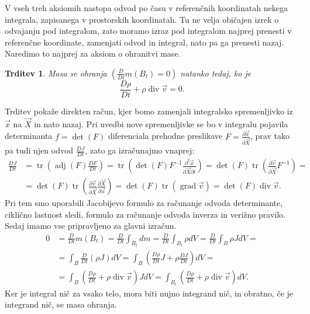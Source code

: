 \documentclass[12pt,a4paper]{article}
\theoremstyle{definition} %
\theoremstyle{plain} %
\newtheorem{trditev}[definicija]{Trditev}
\numberwithin{equation}{section}
\renewcommand{\div}{\operatorname{div}}
\newcommand{\grad}{\operatorname{grad}}
\newcommand{\dpar}[2]{\ensuremath{\frac{\partial #1}{\partial #2}}}
\newcommand{\DD}[2]{\ensuremath{\frac{D #1}{D #2}}}
\newcommand{\DDt}[1]{\DD{#1}{t}}
\newcommand{\vv}{\vec{v}}
\newcommand{\vX}{\vec{X}}
\newcommand{\vx}{\vec{x}}
\DeclareMathOperator{\tr}{tr}
\begin{document}
V vseh treh aksiomih nastopa odvod po času v referenčnih koordinatah nekega
integrala, zapisanega v prostorskih koordinatah. Tu ne velja običajen izrek o
odvajanju pod integralom, zato moramo izraz pod integralom najprej prenesti v
referenčne koordinate, zamenjati odvod in integral, nato pa ga prenesti nazaj.
Naredimo to najprej za aksiom o ohranitvi mase.
\begin{trditev} Masa se ohranja $(\DDt{}m(B_t) = 0)$ natanko tedaj, ko je
  \begin{equation}
    \DDt\rho + \rho\div\vv = 0.
    \label{eq:ohr-masa}
  \end{equation}
\end{trditev}
\proof
Trditev pokaže direkten račun, kjer bomo zamenjali integralsko spremenljivko iz
$\vx$ na $\vX$ in nato nazaj. Pri uvedbi nove spremenljivke se bo v integralu
pojavila determinanta $f = \det(F)$ diferenciala prehodne preslikave $F =
\dpar{\vx}{\vX}$, prav tako pa tudi njen odvod $\DDt{J}$, zato ga izračunajmo vnaprej:
\begin{align*}
  \DDt J &= \tr\left(\operatorname{adj}(F) \DDt{F}\right) =
  \tr\left(\det(F)F^{-1} \dpar{^2\vx}{\vX\partial t}\right) =
  \det(F)\tr\left(\dpar{\vv}{\vX}F^{-1}\right) = \\ &=
  \det(F)\tr\left(\dpar{\vv}{\vX}\dpar{\vX}{\vx}\right) =
  \det(F)\tr\left(\grad \vv\right) =
  \det(F)\div \vv.
\end{align*}
Pri tem smo uporabili Jacobijevo formulo za računanje odvoda
determinante, ciklično lastnost sledi, formulo za računanje odvoda inverza in verižno pravilo.
Sedaj imamo vse pripravljeno za glavni izračun.
\begin{align*}
  0 &= \DDt{}m(B_t) =
  \DDt{} \int_{B_t} dm =
  \DDt{} \int_{B_t} \rho dV =
  \DDt{} \int_{B} \rho J dV =\\ &=
  \int_{B} \DDt{}(\rho J) dV =
  \int_{B}\left( \DDt{\rho} J + \rho \DDt{J} \right)dV = \\ &=
  \int_{B}\left( \DDt{\rho}  + \rho \div\vv\right) J dV =
  \int_{B_t}\left( \DDt{\rho}  + \rho \div\vv\right) dV.
\end{align*}
Ker je integral nič za vsako telo, mora biti nujno integrand nič, in obratno, če
je integrand nič, se masa ohranja.
\endproof
\end{document}
